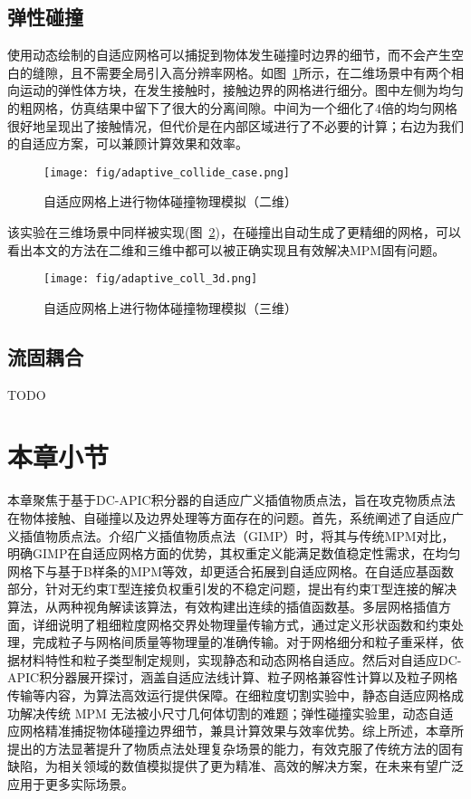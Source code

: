 \subsection{弹性碰撞}
使用动态绘制的自适应网格可以捕捉到物体发生碰撞时边界的细节，而不会产生空白的缝隙，且不需要全局引入高分辨率网格。如图~\ref{fig:adaptive_collide_case}所示，在二维场景中有两个相向运动的弹性体方块，在发生接触时，接触边界的网格进行细分。图中左侧为均匀的粗网格，仿真结果中留下了很大的分离间隙。中间为一个细化了4倍的均匀网格很好地呈现出了接触情况，但代价是在内部区域进行了不必要的计算；右边为我们的自适应方案，可以兼顾计算效果和效率。
\begin{figure}[H]
    \centering
    \texttt{[image: fig/adaptive\_collide\_case.png]}
    \caption{自适应网格上进行物体碰撞物理模拟（二维）}
    \label{fig:adaptive_collide_case}
\end{figure}


该实验在三维场景中同样被实现(图~\ref{fig:adaptive_collide_3d})，在碰撞出自动生成了更精细的网格，可以看出本文的方法在二维和三维中都可以被正确实现且有效解决MPM固有问题。
\begin{figure}[H]
    \centering
    \texttt{[image: fig/adaptive\_coll\_3d.png]}
    \caption{自适应网格上进行物体碰撞物理模拟（三维）}
    \label{fig:adaptive_collide_3d}
\end{figure}

\subsection{流固耦合}
TODO

\section{本章小节}
本章聚焦于基于DC-APIC积分器的自适应广义插值物质点法，旨在攻克物质点法在物体接触、自碰撞以及边界处理等方面存在的问题。首先，系统阐述了自适应广义插值物质点法。介绍广义插值物质点法（GIMP）时，将其与传统MPM对比，明确GIMP在自适应网格方面的优势，其权重定义能满足数值稳定性需求，在均匀网格下与基于B样条的MPM等效，却更适合拓展到自适应网格。在自适应基函数部分，针对无约束T型连接负权重引发的不稳定问题，提出有约束T型连接的解决算法，从两种视角解读该算法，有效构建出连续的插值函数基。多层网格插值方面，详细说明了粗细粒度网格交界处物理量传输方式，通过定义形状函数和约束处理，完成粒子与网格间质量等物理量的准确传输。对于网格细分和粒子重采样，依据材料特性和粒子类型制定规则，实现静态和动态网格自适应。然后对自适应DC-APIC积分器展开探讨，涵盖自适应法线计算、粒子网格兼容性计算以及粒子网格传输等内容，为算法高效运行提供保障。在细粒度切割实验中，静态自适应网格成功解决传统 MPM 无法被小尺寸几何体切割的难题；弹性碰撞实验里，动态自适应网格精准捕捉物体碰撞边界细节，兼具计算效果与效率优势。综上所述，本章所提出的方法显著提升了物质点法处理复杂场景的能力，有效克服了传统方法的固有缺陷，为相关领域的数值模拟提供了更为精准、高效的解决方案，在未来有望广泛应用于更多实际场景。
